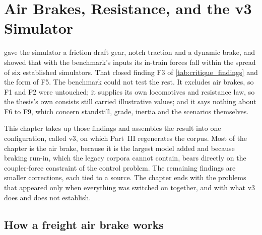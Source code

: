 \chapter{Air Brakes, Resistance, and the v3 Simulator}
\label{ch:v3_sim}


 gave the simulator a friction draft gear, notch traction and a dynamic brake, and showed that with the benchmark's inputs its in-train forces fall within the spread of six established simulators. That closed finding F3 of \cref{tab:critique_findings} and the form of F5. The benchmark could not test the rest. It excludes air brakes, so F1 and F2 were untouched; it supplies its own locomotives and resistance law, so the thesis's own consists still carried illustrative values; and it says nothing about F6 to F9, which concern standstill, grade, inertia and the scenarios themselves.

This chapter takes up those findings and assembles the result into one configuration, called v3, on which Part~III regenerates the corpus. Most of the chapter is the air brake, because it is the largest model added and because braking run-in, which the legacy corpora cannot contain, bears directly on the coupler-force constraint of the control problem. The remaining findings are smaller corrections, each tied to a source. The chapter ends with the problems that appeared only when everything was switched on together, and with what v3 does and does not establish.

\section{How a freight air brake works}
\label{sec:v3_brake_primer}

